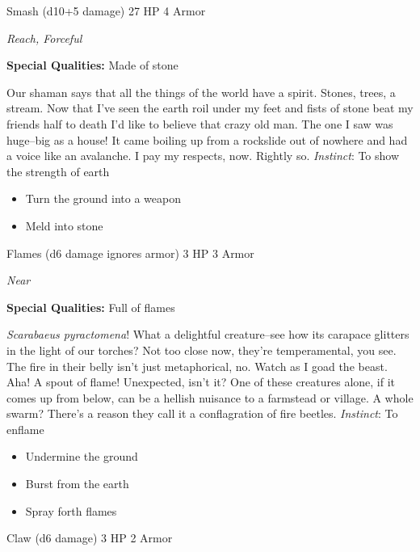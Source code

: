 \HRule
{}

Smash (d10+5 damage)\hspace*{\fill} 27 HP 4 Armor

\emph{Reach, Forceful}

\textbf{Special Qualities:}
Made of stone

\HRule
Our shaman says that all the things of the world have a spirit. Stones, trees, a stream. Now that I've seen the earth roil under my feet and fists of stone beat my friends half to death I'd like to believe that crazy old man. The one I saw was huge--big as a house! It came boiling up from a rockslide out of nowhere and had a voice like an avalanche. I pay my respects, now. Rightly so. \emph{Instinct}: To show the strength of earth
\begin{itemize}
\item Turn the ground into a weapon
\item Meld into stone
\end{itemize}
\newpage
\HRule
{}

Flames (d6 damage ignores armor)\hspace*{\fill} 3 HP 3 Armor

\emph{Near}

\textbf{Special Qualities:}
Full of flames

\HRule
\emph{Scarabaeus pyractomena}! What a delightful creature--see how its carapace glitters in the light of our torches? Not too close now, they're temperamental, you see. The fire in their belly isn't just metaphorical, no. Watch as I goad the beast. Aha! A spout of flame! Unexpected, isn't it? One of these creatures alone, if it comes up from below, can be a hellish nuisance to a farmstead or village. A whole swarm? There's a reason they call it a conflagration of fire beetles. \emph{Instinct}: To enflame
\begin{itemize}
\item Undermine the ground
\item Burst from the earth
\item Spray forth flames
\end{itemize}

\HRule
{}

Claw (d6 damage) \hspace*{\fill}3 HP 2 Armor

